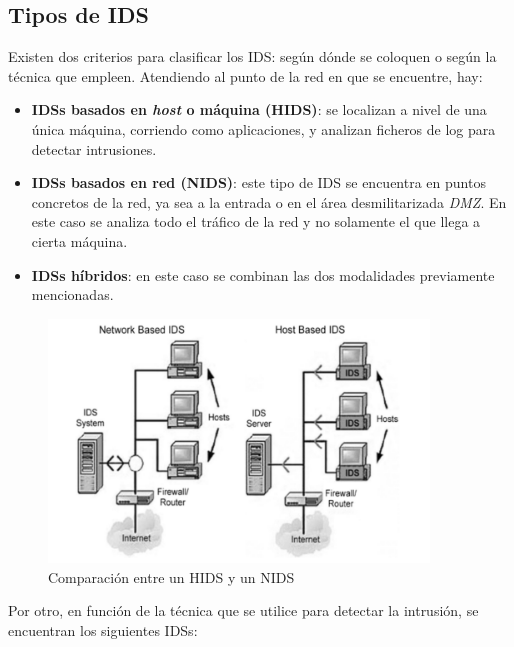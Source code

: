 \subsection{Tipos de IDS}
Existen dos criterios para clasificar los IDS: según dónde se coloquen o según la técnica que empleen. Atendiendo al punto de la red en que se encuentre, hay:
\begin{itemize}
	\item \textbf{IDSs basados en \textit{host} o máquina (HIDS)}: se localizan a nivel de una única máquina, corriendo como aplicaciones, y analizan ficheros de log para detectar intrusiones.
	\item \textbf{IDSs basados en red (NIDS)}: este tipo de IDS se encuentra en puntos concretos de la red, ya sea a la entrada o en el área desmilitarizada \textit{DMZ}. En este caso se analiza todo el tráfico de la red y no solamente el que llega a cierta máquina.
	\item \textbf{IDSs híbridos}: en este caso se combinan las dos modalidades previamente mencionadas.
\end{itemize}
\begin{figure}[t]
\centering
\includegraphics[width=0.9\textwidth]{images/hids.png}
\caption{Comparación entre un HIDS y un NIDS }
\label{fig:hids}
\end{figure}
Por otro, en función de la técnica que se utilice para detectar la intrusión, se encuentran los siguientes IDSs:
